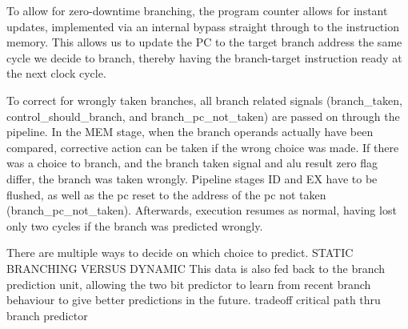 To allow for zero-downtime branching, the program counter allows for instant updates, implemented via an internal bypass straight through to the instruction memory.
This allows us to update the PC to the target branch address the same cycle we decide to branch, thereby having the branch-target instruction ready at the next clock cycle.

To correct for wrongly taken branches, all branch related signals (branch\_taken, control\_should\_branch, and branch\_pc\_not\_taken) are passed on through the pipeline.
In the MEM stage, when the branch operands actually have been compared, corrective action can be taken if the wrong choice was made.
If there was a choice to branch, and the branch taken signal and alu result zero flag differ, the branch was taken wrongly.
Pipeline stages ID and EX have to be flushed, as well as the pc reset to the address of the pc not taken (branch\_pc\_not\_taken).
Afterwards, execution resumes as normal, having lost only two cycles if the branch was predicted wrongly.

There are multiple ways to decide on which choice to predict.
STATIC BRANCHING VERSUS DYNAMIC
This data is also fed back to the branch prediction unit, allowing the two bit predictor to learn from recent branch behaviour to give better predictions in the future.
tradeoff critical path thru branch predictor
